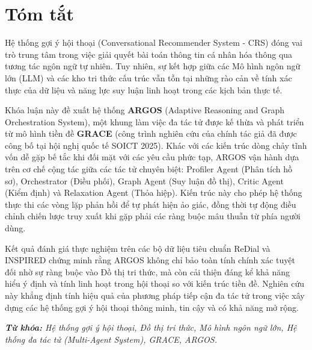 \chapter*{Tóm tắt}
\changefontsizes[16pt]{13pt}

Hệ thống gợi ý hội thoại (Conversational Recommender System - CRS) đóng vai trò trung tâm trong việc giải quyết bài toán thông tin cá nhân hóa thông qua tương tác ngôn ngữ tự nhiên. Tuy nhiên, sự kết hợp giữa các Mô hình ngôn ngữ lớn (LLM) và các kho tri thức cấu trúc vẫn tồn tại những rào cản về tính xác thực của dữ liệu và năng lực suy luận linh hoạt trong các kịch bản thực tế.

Khóa luận này đề xuất hệ thống \textbf{ARGOS} (Adaptive Reasoning and Graph Orchestration System), một khung làm việc đa tác tử được kế thừa và phát triển từ mô hình tiền đề \textbf{GRACE} (công trình nghiên cứu của chính tác giả đã được công bố tại hội nghị quốc tế SOICT 2025). Khác với các kiến trúc dòng chảy tĩnh vốn dễ gặp bế tắc khi đối mặt với các yêu cầu phức tạp, ARGOS vận hành dựa trên cơ chế cộng tác giữa các tác tử chuyên biệt: Profiler Agent (Phân tích hồ sơ), Orchestrator (Điều phối), Graph Agent (Suy luận đồ thị), Critic Agent (Kiểm định) và Relaxation Agent (Thỏa hiệp). Kiến trúc này cho phép hệ thống thực thi các vòng lặp phản hồi để tự phát hiện ảo giác, đồng thời tự động điều chỉnh chiến lược truy xuất khi gặp phải các ràng buộc mâu thuẫn từ phía người dùng.

Kết quả đánh giá thực nghiệm trên các bộ dữ liệu tiêu chuẩn ReDial và INSPIRED chứng minh rằng ARGOS không chỉ bảo toàn tính chính xác tuyệt đối nhờ sự ràng buộc vào Đồ thị tri thức, mà còn cải thiện đáng kể khả năng hiểu ý định và tính linh hoạt trong hội thoại so với kiến trúc tiền đề. Nghiên cứu này khẳng định tính hiệu quả của phương pháp tiếp cận đa tác tử trong việc xây dựng các hệ thống gợi ý hội thoại thông minh, tin cậy và có khả năng mở rộng.

\vspace{-0.5cm}
\begin{flushleft}
  \textit{\textbf{Từ khóa:} Hệ thống gợi ý hội thoại, Đồ thị tri thức, Mô hình ngôn ngữ lớn, Hệ thống đa tác tử (Multi-Agent System), GRACE, ARGOS.}

\end{flushleft}
